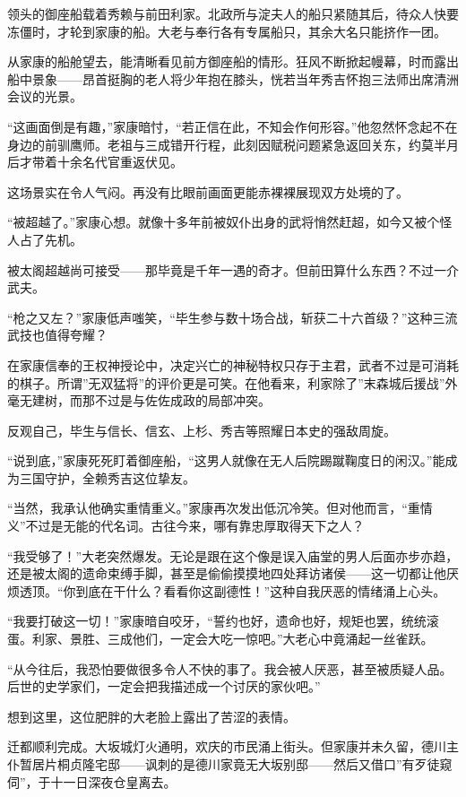 \documentclass[
]{book}
\begin{document}
领头的御座船载着秀赖与前田利家。北政所与淀夫人的船只紧随其后，待众人快要冻僵时，才轮到家康的船。大老与奉行各有专属船只，其余大名只能挤作一团。

从家康的船舱望去，能清晰看见前方御座船的情形。狂风不断掀起幔幕，时而露出船中景象------昂首挺胸的老人将少年抱在膝头，恍若当年秀吉怀抱三法师出席清洲会议的光景。

``这画面倒是有趣，''家康暗忖，``若正信在此，不知会作何形容。''他忽然怀念起不在身边的前驯鹰师。老祖与三成错开行程，此刻因赋税问题紧急返回关东，约莫半月后才带着十余名代官重返伏见。

这场景实在令人气闷。再没有比眼前画面更能赤裸裸展现双方处境的了。

``被超越了。''家康心想。就像十多年前被奴仆出身的武将悄然赶超，如今又被个怪人占了先机。

被太阁超越尚可接受------那毕竟是千年一遇的奇才。但前田算什么东西？不过一介武夫。

``枪之又左？''家康低声嗤笑，``毕生参与数十场合战，斩获二十六首级？''这种三流武技也值得夸耀？

在家康信奉的王权神授论中，决定兴亡的神秘特权只存于主君，武者不过是可消耗的棋子。所谓''无双猛将''的评价更是可笑。在他看来，利家除了''末森城后援战''外毫无建树，而那不过是与佐佐成政的局部冲突。

反观自己，毕生与信长、信玄、上杉、秀吉等照耀日本史的强敌周旋。

``说到底，''家康死死盯着御座船，``这男人就像在无人后院踢蹴鞠度日的闲汉。''能成为三国守护，全赖秀吉这位挚友。

``当然，我承认他确实重情重义。''家康再次发出低沉冷笑。但对他而言，``重情义''不过是无能的代名词。古往今来，哪有靠忠厚取得天下之人？

``我受够了！''大老突然爆发。无论是跟在这个像是误入庙堂的男人后面亦步亦趋，还是被太阁的遗命束缚手脚，甚至是偷偷摸摸地四处拜访诸侯------这一切都让他厌烦透顶。``你到底在干什么？看看你这副德性！''这种自我厌恶的情绪涌上心头。

``我要打破这一切！''家康暗自咬牙，``誓约也好，遗命也好，规矩也罢，统统滚蛋。利家、景胜、三成他们，一定会大吃一惊吧。''大老心中竟涌起一丝雀跃。

``从今往后，我恐怕要做很多令人不快的事了。我会被人厌恶，甚至被质疑人品。后世的史学家们，一定会把我描述成一个讨厌的家伙吧。''

想到这里，这位肥胖的大老脸上露出了苦涩的表情。

迁都顺利完成。大坂城灯火通明，欢庆的市民涌上街头。但家康并未久留，德川主仆暂居片桐贞隆宅邸------讽刺的是德川家竟无大坂别邸------然后又借口''有歹徒窥伺''，于十一日深夜仓皇离去。
\end{document}
